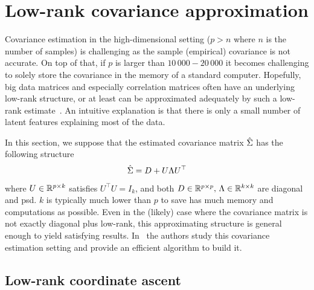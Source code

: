 \section{Low-rank covariance approximation}\label{sec:low_rank_sigma}

Covariance estimation in the high-dimensional setting ($p > n$ where $n$ is the number of samples)
is challenging as the sample (empirical) covariance is not accurate.
On top of that,
if $p$ is larger than $10\,000-20\,000$ it becomes challenging to solely store the covariance in the memory
of a standard computer.
Hopefully, big data matrices and especially correlation matrices often have an underlying low-rank structure,
or at least can be approximated adequately by such a low-rank estimate~\cite{big_data_low_rank}.
An intuitive explanation is that there is only a small number of latent features explaining most of the data.

In this section, we suppose that the estimated covariance matrix $\hat{\Sigma}$ has the following structure
\begin{equation*}
    \hat{\Sigma} = D + U \Lambda U^\top
\end{equation*}
where $U \in \mathbb{R}^{p \times k}$ satisfies $U^\top U = I_k$,
and both $D \in \mathbb{R}^{p \times p},\, \Lambda \in \mathbb{R}^{k \times k}$
are diagonal and psd.
$k$ is typically much lower than $p$ to save has much memory and computations as possible.
Even in the (likely) case where the covariance matrix is not exactly diagonal plus low-rank,
this approximating structure is general enough to yield satisfying results.
In~\cite{low_rank_cov_estimation} the authors study this covariance estimation setting and provide an
efficient algorithm to build it.

\subsection{Low-rank coordinate ascent}\label{subsec:low_rank_sdp}


